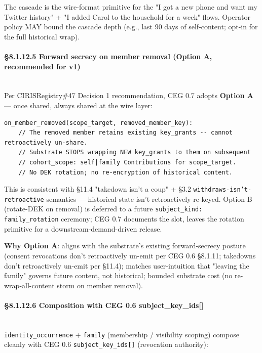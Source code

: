 \documentclass[10pt]{article}
\begin{document}
The cascade is the wire-format primitive for the "I got a new phone and want my Twitter history" + "I added Carol to the household for a week" flows. Operator policy MAY bound the cascade depth (e.g., last 90 days of self-content; opt-in for the full historical wrap).


\paragraph{§8.1.12.5 Forward secrecy on member removal (Option A, recommended for v1)}\mbox{}\\


Per CIRISRegistry\#47 Decision 1 recommendation, CEG 0.7 adopts \textbf{Option A} — once shared, always shared at the wire layer:


\begin{lstlisting}
on_member_removed(scope_target, removed_member_key):
    // The removed member retains existing key_grants -- cannot retroactively un-share.
    // Substrate STOPS wrapping NEW key_grants to them on subsequent
    // cohort_scope: self|family Contributions for scope_target.
    // No DEK rotation; no re-encryption of historical content.
\end{lstlisting}

This is consistent with §11.4 "takedown isn't a coup" + §3.2 \texttt{withdraws-isn't-retroactive} semantics — historical state isn't retroactively re-keyed. Option B (rotate-DEK on removal) is deferred to a future \texttt{subject\_kind: family\_rotation} ceremony; CEG 0.7 documents the slot, leaves the rotation primitive for a downstream-demand-driven release.


\textbf{Why Option A}: aligns with the substrate's existing forward-secrecy posture (consent revocations don't retroactively un-emit per CEG 0.6 §8.1.11; takedowns don't retroactively un-emit per §11.4); matches user-intuition that "leaving the family" governs future content, not historical; bounded substrate cost (no re-wrap-all-content storm on member removal).


\paragraph{§8.1.12.6 Composition with CEG 0.6 subject\_key\_ids[]}\mbox{}\\


\texttt{identity\_occurrence} + \texttt{family} (membership / visibility scoping) compose cleanly with CEG 0.6 \texttt{subject\_key\_ids[]} (revocation authority):
\end{document}
